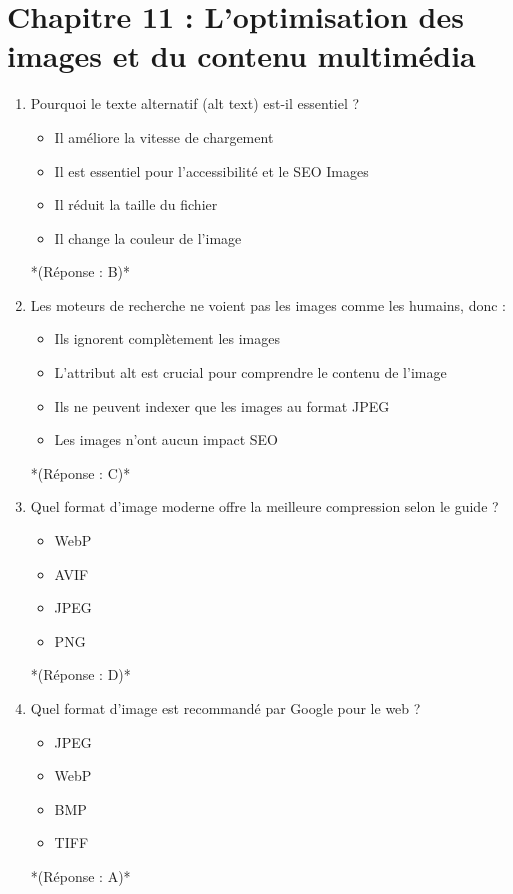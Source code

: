 \documentclass[12pt,a4paper,twoside]{report}
\begin{document}
\newpage

\section*{Chapitre 11 : L'optimisation des images et du contenu multimédia}

\begin{enumerate}
\item Pourquoi le texte alternatif (alt text) est-il essentiel ?
\begin{itemize}
\item[A)] Il améliore la vitesse de chargement
\item[B)] Il est essentiel pour l'accessibilité et le SEO Images
\item[C)] Il réduit la taille du fichier
\item[D)] Il change la couleur de l'image
\end{itemize}
*(Réponse : B)*

\item Les moteurs de recherche ne voient pas les images comme les humains, donc :
\begin{itemize}
\item[A)] Ils ignorent complètement les images
\item[B)] L'attribut alt est crucial pour comprendre le contenu de l'image
\item[C)] Ils ne peuvent indexer que les images au format JPEG
\item[D)] Les images n'ont aucun impact SEO
\end{itemize}
*(Réponse : C)*

\item Quel format d'image moderne offre la meilleure compression selon le guide ?
\begin{itemize}
\item[A)] WebP
\item[B)] AVIF
\item[C)] JPEG
\item[D)] PNG
\end{itemize}
*(Réponse : D)*

\item Quel format d'image est recommandé par Google pour le web ?
\begin{itemize}
\item[A)] JPEG
\item[B)] WebP
\item[C)] BMP
\item[D)] TIFF
\end{itemize}
*(Réponse : A)*


\end{enumerate}
\end{document}
